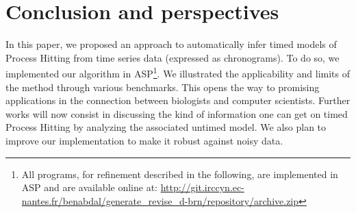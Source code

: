 \section{Conclusion and perspectives}
\label{sec:conclusion}

In this paper, we proposed an approach to automatically infer timed models of Process Hitting from time series data (expressed as chronograms). To do so, we implemented our algorithm in ASP\footnote{All programs, for refinement described in the following, are implemented in ASP and are available online at: \url{http://git.irccyn.ec-nantes.fr/benabdal/generate_revise_d-brn/repository/archive.zip}}. We illustrated the applicability and limits of the method through various benchmarks. This opens the way to promising applications in the connection between biologists and computer scientists. Further works will now consist in discussing the kind of information one can get on timed Process Hitting by analyzing the associated untimed model. We also plan to improve our implementation to make it robust against noisy data.  
